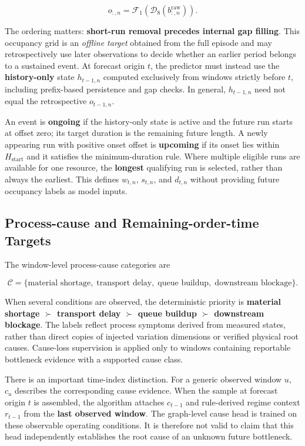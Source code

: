 \[
o_{:,n}=\mathcal{F}_{1}\!\left(\mathcal{D}_{8}\!\left(b^{\mathrm{raw}}_{:,n}\right)\right).
\]

The ordering matters: \textbf{short-run removal precedes internal gap filling}. This occupancy grid is an \emph{offline target} obtained from the full episode and may retrospectively use later observations to decide whether an earlier period belongs to a sustained event. At forecast origin \(t\), the predictor must instead use the \textbf{history-only} state \(h_{t-1,n}\) computed exclusively from windows strictly before \(t\), including prefix-based persistence and gap checks. In general, \(h_{t-1,n}\) need not equal the retrospective \(o_{t-1,n}\).

An event is \textbf{ongoing} if the history-only state is active and the future run starts at offset zero; its target duration is the remaining future length. A newly appearing run with positive onset offset is \textbf{upcoming} if its onset lies within \(H_{\mathrm{start}}\) and it satisfies the minimum-duration rule. Where multiple eligible runs are available for one resource, the \textbf{longest} qualifying run is selected, rather than always the earliest. This defines \(w_{t,n}\), \(s_{t,n}\), and \(d_{t,n}\) without providing future occupancy labels as model inputs.

\subsection{Process-cause and Remaining-order-time Targets}\label{process-cause-and-remaining-order-time-targets}

The window-level process-cause categories are

\[
\mathcal{C}=\{\text{material shortage},\;\text{transport delay},\;\text{queue buildup},\;\text{downstream blockage}\}.
\]

When several conditions are observed, the deterministic priority is \textbf{material shortage \(\succ\) transport delay \(\succ\) queue buildup \(\succ\) downstream blockage}. The labels reflect process symptoms derived from measured states, rather than direct copies of injected variation dimensions or verified physical root causes. Cause-loss supervision is applied only to windows containing reportable bottleneck evidence with a supported cause class.

There is an important time-index distinction. For a generic observed window \(u\), \(c_u\) describes the corresponding cause evidence. When the sample at forecast origin \(t\) is assembled, the algorithm attaches \(c_{t-1}\) and rule-derived regime context \(r_{t-1}\) from the \textbf{last observed window}. The graph-level cause head is trained on these observable operating conditions. It is therefore not valid to claim that this head independently establishes the root cause of an unknown future bottleneck.

